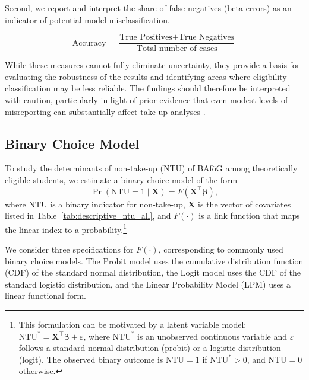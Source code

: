 Second, we report and interpret the share of false negatives (beta errors) as an indicator of potential model misclassification.

\begin{equation} \label{eq:accuracy_microsimulation}
    \text{Accuracy} = \frac{\text{True Positives} + \text{True Negatives}}{\text{Total number of cases}}
\end{equation}

While these measures cannot fully eliminate uncertainty, they provide a basis for evaluating the robustness of the results and identifying areas where eligibility classification may be less reliable. The findings should therefore be interpreted with caution, particularly in light of prior evidence that even modest levels of misreporting can substantially affect take-up analyses \citep{pudney_impact_2001}.


%
%
\subsection{Binary Choice Model}

To study the determinants of non-take-up (NTU) of BAföG among theoretically eligible students, we estimate a binary choice model of the form
\begin{equation}
  \Pr(\mathrm{NTU} = 1 \mid \mathbf{X}) = F(\mathbf{X}^\top \boldsymbol{\beta}),
\end{equation}
where \( \mathrm{NTU} \) is a binary indicator for non-take-up, \( \mathbf{X} \) is the vector of covariates listed in Table~\ref{tab:descriptive_ntu_all}, and \( F(\cdot) \) is a link function that maps the linear index to a probability.\footnote{
This formulation can be motivated by a latent variable model: \( \mathrm{NTU}^* = \mathbf{X}^\top \boldsymbol{\beta} + \varepsilon \), where \( \mathrm{NTU}^* \) is an unobserved continuous variable and \( \varepsilon \) follows a standard normal distribution (probit) or a logistic distribution (logit). The observed binary outcome is \( \mathrm{NTU} = 1 \) if \( \mathrm{NTU}^* > 0 \), and \( \mathrm{NTU} = 0 \) otherwise.
}

We consider three specifications for \( F(\cdot) \), corresponding to commonly used binary choice models. 
The Probit model uses the cumulative distribution function (CDF) of the standard normal distribution, the Logit model uses the CDF of the standard logistic distribution, and the Linear Probability Model (LPM) uses a linear functional form.

